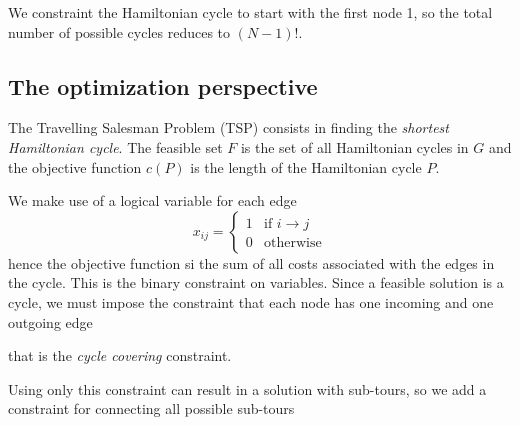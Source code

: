 We constraint the Hamiltonian cycle to start with the first node 1, so the total number of possible cycles reduces to $(N-1)!$.


\subsection{The optimization perspective}

The Travelling Salesman Problem (TSP) consists in finding the \emph{shortest Hamiltonian cycle}. The feasible set $F$ is the set of all Hamiltonian cycles in $G$ and the objective function $c(P)$ is the length of the Hamiltonian cycle $P$.

We make use of a logical variable for each edge
\[
x_{ij}=
\begin{cases}
	1 & \text{if $i\rightarrow j$} \\
	0 & \text{otherwise}
\end{cases}
\]
hence the objective function si the sum of all costs associated with the edges in the cycle. This is the binary constraint on variables. Since a feasible solution is a cycle, we must impose the constraint that each node has one incoming and one outgoing edge

\begin{center}
\end{center}
that is the \emph{cycle covering} constraint.

Using only this constraint can result in a solution with sub-tours, so we add a constraint for connecting all possible sub-tours

